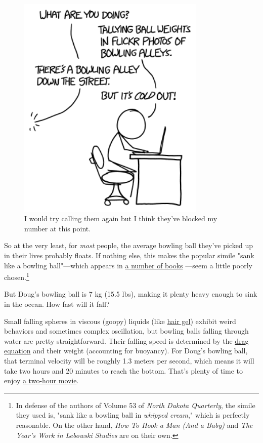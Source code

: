 {\begin{figure}[!htbp]
\centering
\includegraphics[scale=0.5, max width=0.8\textwidth]{imgs/a/125/cold.png}
\caption{I would try calling them again but I think they've blocked my number at this point.}
\end{figure}

{So at the very least, for \emph{most} people, the average bowling ball they've picked up in their lives probably floats. If nothing else, this makes the popular simile "sank like a bowling ball"—which appears in \href{https://www.google.com/search?q=\%22sank+like+a+bowling+ball\%22&btnG=Search+Books&tbm=bks&tbo=1}{a number of books} —seem a little poorly chosen.{\footnote{In defense of the authors of Volume 53 of \emph{North Dakota Quarterly}, the simile they used is, "sank like a bowling ball in \emph{whipped cream}," which is perfectly reasonable. On the other hand, \emph{How To Hook a Man (And a Baby)} and \emph{The Year's Work in Lebowski Studies} are on their own.} } }

{But Doug's bowling ball is 7 kg (15.5 lbs), making it plenty heavy enough to sink in the ocean. How fast will it fall?}

{Small falling spheres in viscous (goopy) liquids (like \href{http://arxiv.org/pdf/1108.3427.pdf}{hair gel}) exhibit weird behaviors and sometimes complex oscillation, but bowling balls falling through water are pretty straightforward. Their falling speed is determined by the \href{https://en.wikipedia.org/wiki/Drag\_equation}{drag equation} and their weight (accounting for buoyancy). For Doug's bowling ball, that terminal velocity will be roughly 1.3 meters per second, which means it will take two hours and 20 minutes to reach the bottom. That's plenty of time to enjoy \href{http://www.imdb.com/title/tt0118715/} {a two-hour movie}.}

}

